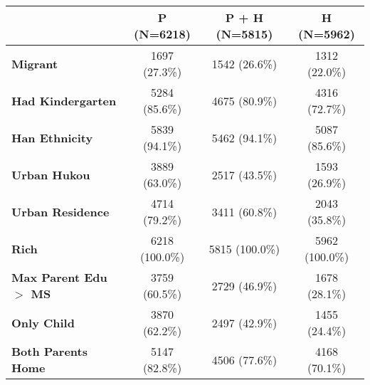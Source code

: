 
\begin{tabular}{l|c|c|c}
\hline
 & P (N=6218) & P + H (N=5815) & H (N=5962)\\
\hline
\textbf{Migrant} & 1697 (27.3\%) & 1542 (26.6\%) & 1312 (22.0\%)\\
\hline
\textbf{Had Kindergarten} & 5284 (85.6\%) & 4675 (80.9\%) & 4316 (72.7\%)\\
\hline
\textbf{Han Ethnicity} & 5839 (94.1\%) & 5462 (94.1\%) & 5087 (85.6\%)\\
\hline
\textbf{Urban Hukou} & 3889 (63.0\%) & 2517 (43.5\%) & 1593 (26.9\%)\\
\hline
\textbf{Urban Residence} & 4714 (79.2\%) & 3411 (60.8\%) & 2043 (35.8\%)\\
\hline
\textbf{Rich} & 6218 (100.0\%) & 5815 (100.0\%) & 5962 (100.0\%)\\
\hline
\textbf{Max Parent Edu $>$ MS} & 3759 (60.5\%) & 2729 (46.9\%) & 1678 (28.1\%)\\
\hline
\textbf{Only Child} & 3870 (62.2\%) & 2497 (42.9\%) & 1455 (24.4\%)\\
\hline
\textbf{Both Parents Home} & 5147 (82.8\%) & 4506 (77.6\%) & 4168 (70.1\%)\\
\hline
\end{tabular}

